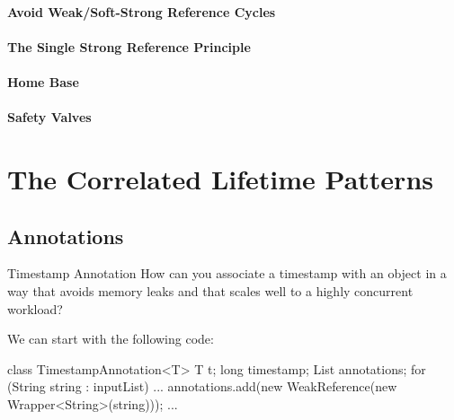 \paragraph{Avoid Weak/Soft-Strong Reference Cycles}

\paragraph{The Single Strong Reference Principle}	
\paragraph{Home Base}
\paragraph{Safety Valves}

\section{The Correlated Lifetime Patterns}

\subsection{Annotations}

\begin{example}{Timestamp Annotation}
How can you associate a timestamp with an object in a way that avoids memory
leaks and that scales well to a highly concurrent workload?
\end{example}

We can start with the following code:

\begin{shortlisting}
class TimestampAnnotation<T> {
	T t;
	long timestamp;
}
List annotations;
for (String string : inputList) {
	...
	annotations.add(new WeakReference(new Wrapper<String>(string)));
	...
}
\end{shortlisting}

